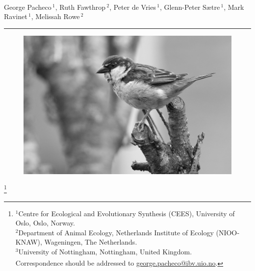 \documentclass[twoside, british, a4paper]{article}
\newcommand\myhline{\noindent\rule[.5pt]{\linewidth}{.4pt}\par}
\newcommand\blfootnote[1]{%
  \begingroup
  \renewcommand\thefootnote{}\footnote{#1}%
  \addtocounter{footnote}{-1}%
  \endgroup}
\begin{document}
\thispagestyle{empty}

\hfill\break

\Large{\bfseries{\color[rgb]{.25,.25,.25}}} \\

\hfill
\hfill

\LARGE{\bfseries{\color[rgb]{0,0,0}}} \\

 \small \noindent 
George Pacheco\,$^{1}$\textsuperscript{\faEnvelopeO},
Ruth Fawthrop\,$^{2}$,
Peter de Vries\,$^{1}$,
Glenn-Peter Sætre\,$^{1}$,
Mark Ravinet\,$^{1}$,
Melissah Rowe\,$^{2}$ \\
\myhline

\vspace{3cm}

\begin{figure}[h!]
\centering
\includegraphics[width=1\textwidth]{./Y150239Genomics_SIPicture.png}
\captionsetup{labelformat=empty}
\label{SI:Y150239Genomics--MeanDepth}
\end{figure}

\blfootnote{\scriptsize{$^1$Centre for Ecological and Evolutionary Synthesis (CEES), University of Oslo, Oslo, Norway. \\
$^2$Department of Animal Ecology, Netherlands Institute of Ecology (NIOO‐KNAW), Wageningen, The Netherlands. \\
$^3$University of Nottingham, Nottingham, United Kingdom. \\
\textsuperscript{\faEnvelopeO}Correspondence should be addressed to \href{mailto:george.pacheco@ibv.uio.no}{george.pacheco@ibv.uio.no}.}}
\end{document}
